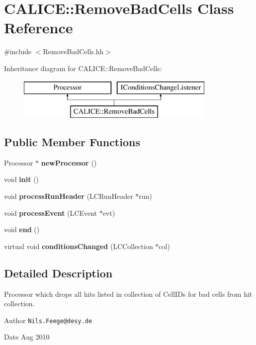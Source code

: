 \section{C\-A\-L\-I\-C\-E\-:\-:Remove\-Bad\-Cells Class Reference}
\label{classCALICE_1_1RemoveBadCells}


{\ttfamily \#include $<$Remove\-Bad\-Cells.\-hh$>$}

Inheritance diagram for C\-A\-L\-I\-C\-E\-:\-:Remove\-Bad\-Cells\-:\begin{figure}[H]
\begin{center}
\leavevmode
\includegraphics[height=2.000000cm]{classCALICE_1_1RemoveBadCells}
\end{center}
\end{figure}
\subsection*{Public Member Functions}
\begin{DoxyCompactItemize}
\item 
Processor $\ast$ {\bfseries new\-Processor} ()\label{classCALICE_1_1RemoveBadCells_a9788e160675b264d91fe6f423061a925}

\item 
void {\bf init} ()
\item 
void {\bf process\-Run\-Header} (L\-C\-Run\-Header $\ast$run)
\item 
void {\bf process\-Event} (L\-C\-Event $\ast$evt)
\item 
void {\bf end} ()
\item 
virtual void {\bfseries conditions\-Changed} (L\-C\-Collection $\ast$col)\label{classCALICE_1_1RemoveBadCells_abbc5dd5734b98c7db502fa6686a0b93a}

\end{DoxyCompactItemize}


\subsection{Detailed Description}
Processor which drops all hits listed in collection of Cell\-I\-Ds for bad cells from hit collection.

\begin{DoxyAuthor}{Author}
{\tt Nils.\-Feege@desy.\-de} 
\end{DoxyAuthor}
\begin{DoxyDate}{Date}
Aug 2010 
\end{DoxyDate}


